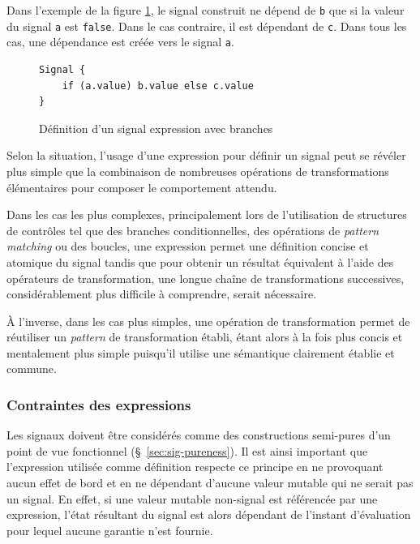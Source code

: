 Dans l'exemple de la figure \ref{fig:signal-expr-branches}, le signal construit ne dépend de \texttt{b} que si la valeur du signal \texttt{a} est \texttt{false}. Dans le cas contraire, il est dépendant de \texttt{c}. Dans tous les cas, une dépendance est créée vers le signal \texttt{a}.

\begin{figure}[!h]
	\begin{lstlisting}
Signal {
	if (a.value) b.value else c.value
}
	\end{lstlisting}
	\caption{Définition d'un signal expression avec branches}
	\label{fig:signal-expr-branches}
\end{figure}

Selon la situation, l'usage d'une expression pour définir un signal peut se révéler plus simple que la combinaison de nombreuses opérations de transformations élémentaires pour composer le comportement attendu.

Dans les cas les plus complexes, principalement lors de l'utilisation de structures de contrôles tel que des branches conditionnelles, des opérations de \emph{pattern matching} ou des boucles, une expression permet une définition concise et atomique du signal tandis que pour obtenir un résultat équivalent à l'aide des opérateurs de transformation, une longue chaîne de transformations successives, considérablement plus difficile à comprendre, serait nécessaire.

À l'inverse, dans les cas plus simples, une opération de transformation permet de réutiliser un \emph{pattern} de transformation établi, étant alors à la fois plus concis et mentalement plus simple puisqu'il utilise une sémantique clairement établie et commune.

\subsubsection{Contraintes des expressions}

Les signaux doivent être considérés comme des constructions semi-pures d'un point de vue fonctionnel (§~\ref{sec:sig-pureness}). Il est ainsi important que l'expression utilisée comme définition respecte ce principe en ne provoquant aucun effet de bord et en ne dépendant d'aucune valeur mutable qui ne serait pas un signal. En effet, si une valeur mutable non-signal est référencée par une expression, l'état résultant du signal est alors dépendant de l'instant d'évaluation pour lequel aucune garantie n'est fournie.

